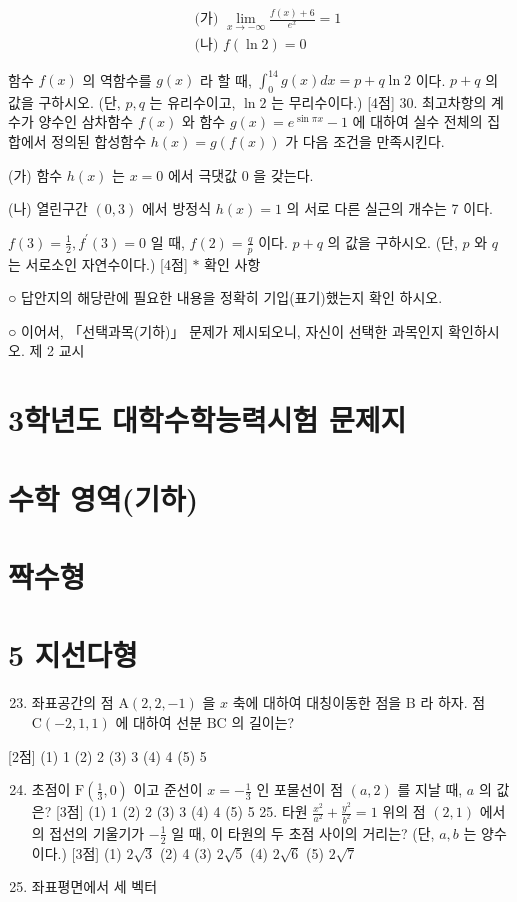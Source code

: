 \documentclass[10pt]{article}
\begin{document}
$$
\begin{aligned}
& \text { (가) } \lim _{x \rightarrow-\infty} \frac{f(x)+6}{e^{x}}=1 \\
& \text { (나) } f(\ln 2)=0
\end{aligned}
$$

함수 $f(x)$ 의 역함수를 $g(x)$ 라 할 때, $\int_{0}^{14} g(x) d x=p+q \ln 2$ 이다. $p+q$ 의 값을 구하시오. (단, $p, q$ 는 유리수이고, $\ln 2$ 는 무리수이다.) [4점] 30. 최고차항의 계수가 양수인 삼차함수 $f(x)$ 와 함수 $g(x)=e^{\sin \pi x}-1$ 에 대하여 실수 전체의 집합에서 정의된 합성함수 $h(x)=g(f(x))$ 가 다음 조건을 만족시킨다.

(가) 함수 $h(x)$ 는 $x=0$ 에서 극댓값 0 을 갖는다.

(나) 열린구간 $(0,3)$ 에서 방정식 $h(x)=1$ 의 서로 다른 실근의 개수는 7 이다.

$f(3)=\frac{1}{2}, f^{\prime}(3)=0$ 일 때, $f(2)=\frac{q}{p}$ 이다. $p+q$ 의 값을 구하시오. (단, $p$ 와 $q$ 는 서로소인 자연수이다.) [4점] $*$ 확인 사항

○ 답안지의 해당란에 필요한 내용을 정확히 기입(표기)했는지 확인 하시오.

○ 이어서, 「선택과목(기하)」 문제가 제시되오니, 자신이 선택한 과목인지 확인하시오. 제 2 교시

\section{3학년도 대학수학능력시험 문제지}
\section{수학 영역(기하)}
\section{짝수형}
\section{5 지선다형}
\begin{enumerate}
  \setcounter{enumi}{22}
  \item 좌표공간의 점 $\mathrm{A}(2,2,-1)$ 을 $x$ 축에 대하여 대칭이동한 점을 $\mathrm{B}$ 라 하자. 점 $\mathrm{C}(-2,1,1)$ 에 대하여 선분 $\mathrm{BC}$ 의 길이는?
\end{enumerate}

[2점]
(1) 1
(2) 2
(3) 3
(4) 4
(5) 5

\begin{enumerate}
  \setcounter{enumi}{23}
  \item 초점이 $\mathrm{F}\left(\frac{1}{3}, 0\right)$ 이고 준선이 $x=-\frac{1}{3}$ 인 포물선이 점 $(a, 2)$ 를 지날 때, $a$ 의 값은? [3점]
(1) 1
(2) 2
(3) 3
(4) 4
(5) 5 25. 타원 $\frac{x^{2}}{a^{2}}+\frac{y^{2}}{b^{2}}=1$ 위의 점 $(2,1)$ 에서의 접선의 기울기가 $-\frac{1}{2}$ 일 때, 이 타원의 두 초점 사이의 거리는? (단, $a, b$ 는 양수이다.) [3점]
(1) $2 \sqrt{3}$
(2) 4
(3) $2 \sqrt{5}$
(4) $2 \sqrt{6}$
(5) $2 \sqrt{7}$

  \item 좌표평면에서 세 벡터

\end{enumerate}
\end{document}
